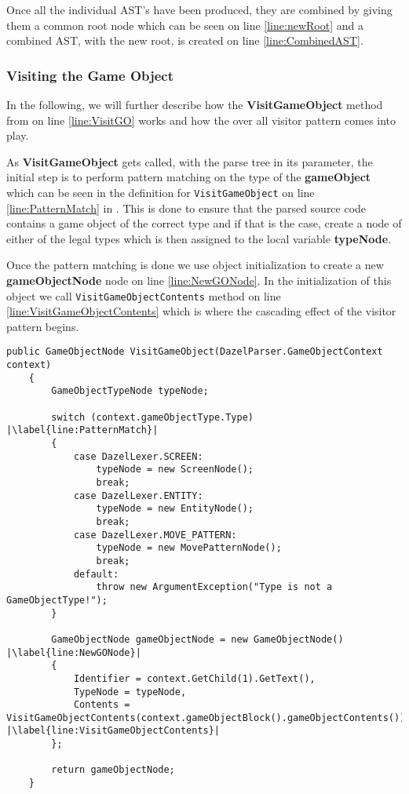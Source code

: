 Once all the individual AST's have been produced, they are combined by giving them a common root node which can be seen on line \ref{line:newRoot} and a combined AST, with the new root, is created on line \ref{line:CombinedAST}.
 
\subsubsection*{Visiting the Game Object}
In the following, we will further describe how the \textbf{VisitGameObject} method from  on line \ref{line:VisitGO} works and how the over all visitor pattern comes into play.

As \textbf{VisitGameObject} gets called, with the parse tree in its parameter, the initial step is to perform pattern matching on the type of the \textbf{gameObject} which can be seen in the definition for \texttt{VisitGameObject} on line \ref{line:PatternMatch} in . This is done to ensure that the parsed source code contains a game object of the correct type and if that is the case, create a node of either of the legal types which is then assigned to the local variable \textbf{typeNode}.

Once the pattern matching is done we use object initialization to create a new \textbf{gameObjectNode} node on line \ref{line:NewGONode}. In the initialization of this object we call \texttt{VisitGameObjectContents} method on line \ref{line:VisitGameObjectContents} which is where the cascading effect of the visitor pattern begins.

\begin{lstlisting}[caption={The initial stage of visiting}, label={lst:VisitParseTree},escapechar=|]
    public GameObjectNode VisitGameObject(DazelParser.GameObjectContext context)
    {
        GameObjectTypeNode typeNode;
        
        switch (context.gameObjectType.Type) |\label{line:PatternMatch}|
        {
            case DazelLexer.SCREEN:
                typeNode = new ScreenNode();
                break;
            case DazelLexer.ENTITY:
                typeNode = new EntityNode();
                break;
            case DazelLexer.MOVE_PATTERN:
                typeNode = new MovePatternNode();
                break;
            default:
                throw new ArgumentException("Type is not a GameObjectType!");
        }

        GameObjectNode gameObjectNode = new GameObjectNode() |\label{line:NewGONode}|
        {
            Identifier = context.GetChild(1).GetText(),
            TypeNode = typeNode,
            Contents = VisitGameObjectContents(context.gameObjectBlock().gameObjectContents()) |\label{line:VisitGameObjectContents}|
        };
        
        return gameObjectNode;
    }
\end{lstlisting}


